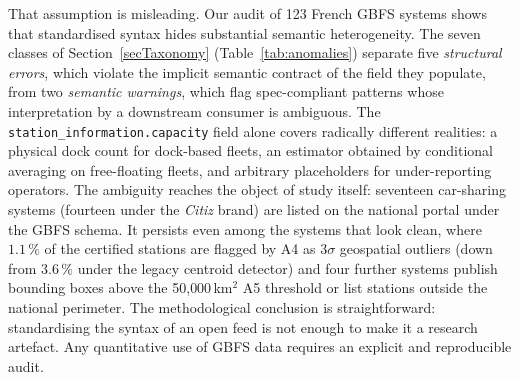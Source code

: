 \documentclass[11pt,a4paper]{article}
\begin{document}
That assumption is misleading. Our audit of 123 French GBFS systems shows
that standardised syntax hides substantial semantic heterogeneity. The
seven classes of Section~\ref{secTaxonomy} (Table~\ref{tab:anomalies})
separate five \emph{structural errors}, which violate the implicit
semantic contract of the field they populate, from two \emph{semantic
warnings}, which flag spec-compliant patterns whose interpretation by a
downstream consumer is ambiguous. The \texttt{station\_information.capacity} field alone covers radically
different realities: a physical dock count for dock-based fleets, an
estimator obtained by conditional averaging on free-floating fleets, and
arbitrary placeholders for under-reporting operators. The ambiguity
reaches the object of study itself: seventeen car-sharing systems
(fourteen under the \emph{Citiz} brand) are listed on the national portal
under the GBFS schema. It persists even among the systems that look
clean, where $1.1\,\%$ of the certified stations are flagged by A4 as
$3\sigma$ geospatial outliers (down from $3.6\,\%$ under the legacy
centroid detector) and four further systems publish bounding boxes above
the 50{,}000\,km$^2$ A5 threshold or list stations outside the national
perimeter. The methodological conclusion is straightforward: standardising
the syntax of an open feed is not enough to make it a research artefact.
Any quantitative use of GBFS data requires an explicit and reproducible
audit.
\end{document}
